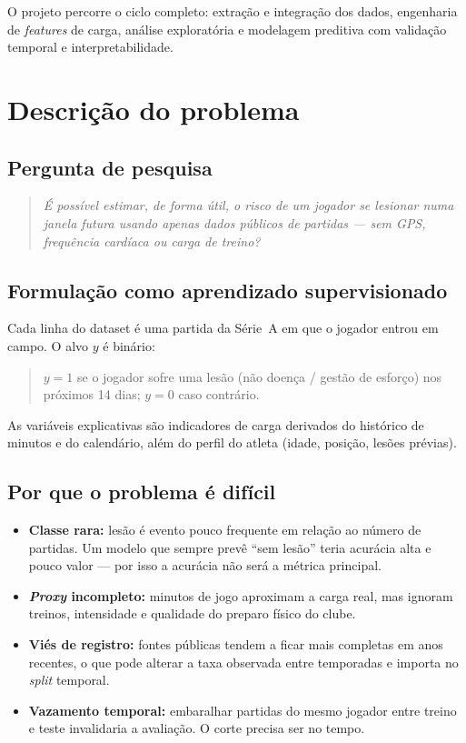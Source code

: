 \documentclass[11pt,a4paper]{article}
\begin{document}
O projeto percorre o ciclo completo: extração e integração dos dados, engenharia de \textit{features} de carga, análise exploratória e modelagem preditiva com validação temporal e interpretabilidade.

\section{Descrição do problema}

\subsection{Pergunta de pesquisa}

\begin{quote}
\textit{É possível estimar, de forma útil, o risco de um jogador se lesionar numa janela futura usando apenas dados públicos de partidas --- sem GPS, frequência cardíaca ou carga de treino?}
\end{quote}

\subsection{Formulação como aprendizado supervisionado}

Cada linha do dataset é uma partida da Série~A em que o jogador entrou em campo. O alvo $y$ é binário:

\begin{quote}
$y = 1$ se o jogador sofre uma lesão (não doença / gestão de esforço) nos próximos 14 dias; $y = 0$ caso contrário.
\end{quote}

As variáveis explicativas são indicadores de carga derivados do histórico de minutos e do calendário, além do perfil do atleta (idade, posição, lesões prévias).

\subsection{Por que o problema é difícil}

\begin{itemize}
  \item \textbf{Classe rara:} lesão é evento pouco frequente em relação ao número de partidas. Um modelo que sempre prevê ``sem lesão'' teria acurácia alta e pouco valor --- por isso a acurácia não será a métrica principal.
  \item \textbf{\textit{Proxy} incompleto:} minutos de jogo aproximam a carga real, mas ignoram treinos, intensidade e qualidade do preparo físico do clube.
  \item \textbf{Viés de registro:} fontes públicas tendem a ficar mais completas em anos recentes, o que pode alterar a taxa observada entre temporadas e importa no \textit{split} temporal.
  \item \textbf{Vazamento temporal:} embaralhar partidas do mesmo jogador entre treino e teste invalidaria a avaliação. O corte precisa ser no tempo.
\end{itemize}
\end{document}
